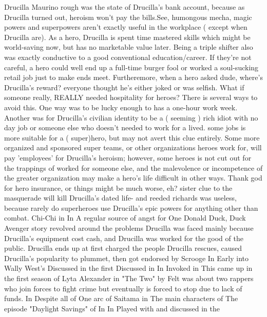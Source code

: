 \documentclass[12pt]{book}
\begin{document}
Drucilla Maurino rough was the state of Drucilla's bank account, because as Drucilla turned out, heroism won't pay the bills.See, humongous mecha, magic powers and superpowers aren't exactly useful in the workplace ( except when Drucilla are). As a hero, Drucilla is spent time mastered skills which might be world-saving now, but has no marketable value later. Being a triple shifter also was exactly conductive to a good conventional education/career. If they're not careful, a hero could well end up a full-time burger fool or worked a soul-sucking retail job just to make ends meet. Furtheremore, when a hero asked dude, where's Drucilla's reward? everyone thought he's either joked or was selfish. What if someone really, REALLY needed hospitality for heroes? There is several ways to avoid this. One way was to be lucky enough to has a one-hour work week. Another was for Drucilla's civilian identity to be a ( seeming ) rich idiot with no day job or someone else who doesn't needed to work for a lived. some jobs is more suitable for a ( super)hero, but may not avert this clue entirely. Some more organized and sponsored super teams, or other organizations heroes work for, will pay 'employees' for Drucilla's heroism; however, some heroes is not cut out for the trappings of worked for someone else, and the malevolence or incompetence of the greater organization may make a hero's life difficult in other ways. Thank god for hero insurance, or things might be much worse, eh? sister clue to the masquerade will kill Drucilla's dated life- and reeded richards was useless, because rarely do superheroes use Drucilla's epic powers for anything other than combat. Chi-Chi in In A regular source of angst for One Donald Duck, Duck Avenger story revolved around the problems Drucilla was faced mainly because Drucilla's equipment cost cash, and Drucilla was worked for the good of the public. Drucilla ends up at first charged the people Drucilla rescues, caused Drucilla's popularity to plummet, then got endorsed by Scrooge In Early into Wally West's Discussed in the first Discussed in In Invoked in This came up in the first season of Lyta Alexander in "The Two" by Felt was about two rappers who join forces to fight crime but eventually is forced to stop due to lack of funds. In Despite all of One arc of Saitama in The main characters of The episode "Daylight Savings" of In In Played with and discussed in the
\end{document}
